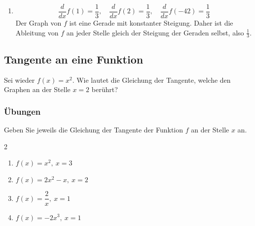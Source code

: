 \begin{enumerate}
    \item
          \[
              \frac{d}{dx}f(1) = \frac{1}{3}, \quad
              \frac{d}{dx}f(2) = \frac{1}{3}, \quad
              \frac{d}{dx}f(-42) = \frac{1}{3}
          \]
          Der Graph von \( f \) ist eine Gerade mit konstanter Steigung. Daher ist die Ableitung von \( f \) an jeder Stelle gleich der Steigung der Geraden selbst, also \( \frac{1}{3} \).

\end{enumerate}
\newpage
\subsection{Tangente an eine Funktion}
\begin{example}
    Sei wieder $f(x)=x^2$. Wie lautet die Gleichung der Tangente, welche den Graphen an der Stelle $x=2$ berührt?


\end{example}
\subsubsection*{Übungen}
Geben Sie jeweils die Gleichung der Tangente der Funktion $f$ an der Stelle $x$ an.
\begin{multicols}{2}
    \begin{enumerate}
        \item $f(x)=x^2,\ x=3$
        \item $f(x)=2x^2-x,\ x=2$
        \item $f(x)=\dfrac{2}{x},\ x=1$
        \item $f(x)=-2x^3,\ x=1$
    \end{enumerate}
\end{multicols}
